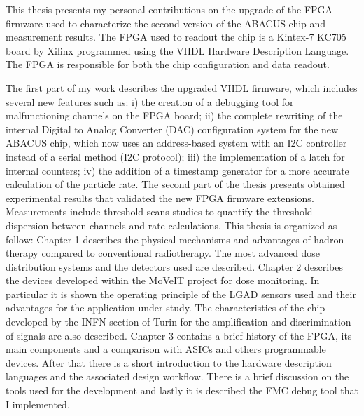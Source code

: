 \newpage
\thispagestyle{plain}
This thesis presents my personal contributions on the upgrade of the FPGA firmware used to characterize
the second version of the ABACUS chip and measurement results.
The FPGA used to readout the chip is a Kintex-7 KC705 board by Xilinx programmed using the VHDL Hardware Description Language. The FPGA
is responsible for both the chip configuration and data readout.

\noindent The first part of my work describes the upgraded VHDL firmware, which includes several new features such as:
i) the creation of a debugging tool for malfunctioning channels on the FPGA board;
ii) the complete rewriting of the internal Digital to Analog Converter (DAC) configuration system for the new ABACUS chip, which
now uses an address-based system with an I2C controller instead of a serial method (I2C protocol);
iii) the implementation of a latch for internal counters;
iv) the addition of a timestamp generator for a more accurate calculation of the particle rate.
\newline
The second part of the thesis presents obtained experimental results that validated the new FPGA firmware extensions.
Measurements include threshold scans studies to quantify the threshold dispersion between channels and rate calculations.
\vspace{1cm}
\newline
This thesis is organized as follow:
\vspace{0.25cm}
\newline
Chapter 1 describes the physical mechanisms and advantages of hadron-therapy compared to conventional radiotherapy. The most advanced dose distribution systems and the detectors used are described.
\vspace{0.25cm}
\newline
Chapter 2 describes the devices developed within the MoVeIT project for dose monitoring.
In particular it is shown the operating principle of the LGAD sensors used and their advantages for the application under study.
The characteristics of the chip developed by the INFN section of Turin for the amplification and discrimination of signals are also described.
\vspace{0.25cm}
\newline
Chapter 3 contains a brief history of the FPGA, its main components and a comparison with ASICs and others programmable devices.
After that there is a short introduction to the hardware description languages and the associated design workflow.
There is a brief discussion on the tools used for the development and lastly it is described the FMC debug tool that I implemented.
